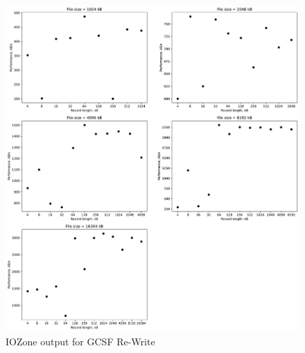 \begin{figure}[!htb]
	\label{fig:app_benchgcsfs_re_write}
	\begin{center}
		\includegraphics[width=1.0\textwidth]{figures/benchmarking/gcsf/Re-Write.pdf}
	\end{center}
	\caption{IOZone output for GCSF \mbox{Re-Write}}
\end{figure}

